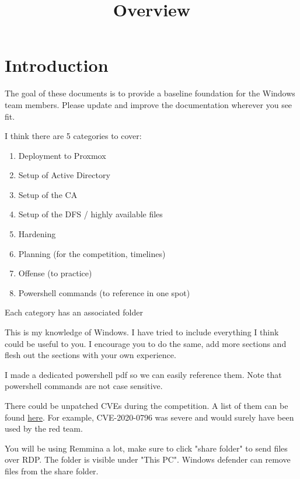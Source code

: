 \documentclass{article}
\begin{document}
\title{Overview}

\graphicspath{ {./Images/} }
\tableofcontents

\section{Introduction}
The goal of these documents is to provide a baseline foundation for the Windows team members.
Please update and improve the documentation wherever you see fit.

I think there are 5 categories to cover:

\begin{enumerate}
        \item Deployment to Proxmox
        \item Setup of Active Directory
        \item Setup of the CA
        \item Setup of the DFS / highly available files
        \item Hardening
        \item Planning (for the competition, timelines)
        \item Offense (to practice)
        \item Powershell commands (to reference in one spot)
\end{enumerate}

Each category has an associated folder

This is my knowledge of Windows. I have tried to include everything I think could be useful to you.
I encourage you to do the same, add more sections and flesh out the sections with your own experience.

I made a dedicated powershell pdf so we can easily reference them.
Note that powershell commands are not case sensitive.

There could be unpatched CVEs during the competition. A list of them can be found \href{https://stack.watch/product/microsoft/windows-server-2019/}{here}.
For example, CVE-2020-0796 was severe and would surely have been used by the red team.

You will be using Remmina a lot, make sure to click "share folder" to send files over RDP.
The folder is visible under "This PC".
Windows defender can remove files from the share folder.
\end{document}
